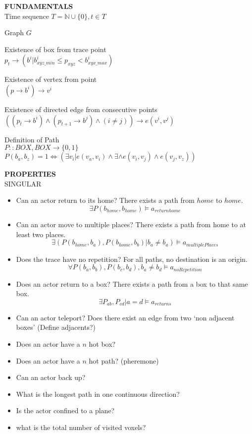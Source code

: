 \documentclass{article}
\newcommand\N{\mathbb{N}}
\begin{document}
\textbf{FUNDAMENTALS}\\
Time sequence
$T =  \N \cup \{0\}, t \in T$

Graph $G$


Existence of box from trace point\\
$p_t \rightarrow (b^i | b_{xyz\_min}^i \leq p_{xyz} < b_{xyx\_max}^i)$


Existence of vertex from point\\
$(p \rightarrow b^i) \rightarrow v^i$

Existence of directed edge from consecutive points\\
$((p_t \rightarrow b^i) \land (p_{t+1} \rightarrow b^j) \land (i \neq j)) \rightarrow e(v^i, v^j) $


Definition of Path\\
$P ::  BOX, BOX \rightarrow \{0,1\}$\\
$P(b_a, b_z) = 1 \Leftrightarrow (\exists v_i | e(v_a, v_i) \land \exists \land e(v_i, v_j) \land e(v_j, v_z)) $



\textbf{PROPERTIES}\\
SINGULAR\\
\begin{itemize}
\item Can an actor return to its home?  There exists a path from $home$ to $home$.  
  $$\exists P(b_{home}, b_{home}) \models a_{returnhome}$$ 
\item Can an actor move to multiple places? There exists a path from home to at least two places.
  $$\exists (P(b_{home}, b_a), P(b_{home}, b_b)| b_a \neq b_a) \models a_{multiplePlaces}$$

\item Does the trace have no repetition? For all paths, no destination is an origin.
  $$\forall P(b_a, b_b), P(b_c, b_d), b_a \neq b_d \models a_{noRepetition}$$

\item Does an actor return to a box? There exists a path from a box to that same box.
  $$\exists P_{ab}, P_{cd} | a = d \models a_{returns}$$
\item Can an actor teleport? Does there exist an edge from two `non adjacent boxes'  (Define adjacents?)
\item Does an actor have a $n$ hot box? 
\item Does an actor have a $n$ hot path? (pheremone)
\item Can an actor back up?
\item What is the longest path in one continuous direction?
\item Is the actor confined to a plane?
\item what is the total number of visited voxels?
\end{itemize}
\end{document}
